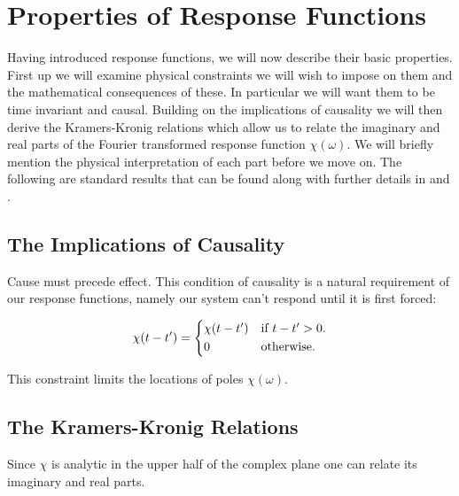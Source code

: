 \section{Properties of Response Functions}

Having introduced response functions, we will now describe their basic properties. First up we will examine physical constraints we will wish to impose on them and the mathematical consequences of these. In particular we will want them to be time invariant and causal. Building on the implications of causality we will then derive the Kramers-Kronig relations which allow us to relate the imaginary and real parts of the Fourier transformed response function $\chi(\omega)$. We will briefly mention the physical interpretation of each part before we move on. The following are standard results that can be found along with further details in \cite{LiviPoliti2017} and \cite{Reichl1999}.

\subsection{The Implications of Causality}

Cause must precede effect. This condition of causality is a natural requirement of our response functions, namely our system can't respond until it is first forced:

\begin{align}
\chi(t - t') = 
\begin{cases*}
\chi(t - t') & if $t -t' > 0$.\\
0 & otherwise.
\end{cases*}
\end{align}

This constraint limits the locations of poles $\chi(\omega)$.

\subsection{The Kramers-Kronig Relations}

Since $\chi$ is analytic in the upper half of the complex plane one can relate its imaginary and real parts.